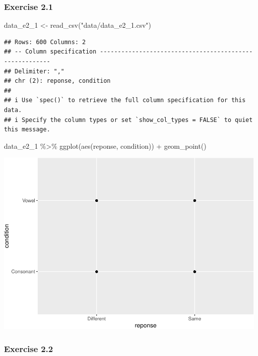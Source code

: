 \documentclass[
]{article}
\newenvironment{Shaded}{\begin{snugshade}}{\end{snugshade}}
\newcommand{\FunctionTok}[1]{\textcolor[rgb]{0.00,0.00,0.00}{#1}}
\newcommand{\NormalTok}[1]{#1}
\newcommand{\OtherTok}[1]{\textcolor[rgb]{0.56,0.35,0.01}{#1}}
\newcommand{\SpecialCharTok}[1]{\textcolor[rgb]{0.00,0.00,0.00}{#1}}
\newcommand{\StringTok}[1]{\textcolor[rgb]{0.31,0.60,0.02}{#1}}
\begin{document}
\hypertarget{exercise-2.1}{%
\subsubsection{Exercise 2.1}\label{exercise-2.1}}

\begin{Shaded}
\begin{Highlighting}[]
\NormalTok{data\_e2\_1 }\OtherTok{\textless{}{-}} \FunctionTok{read\_csv}\NormalTok{(}\StringTok{"data/data\_e2\_1.csv"}\NormalTok{)}
\end{Highlighting}
\end{Shaded}

\begin{verbatim}
## Rows: 600 Columns: 2
## -- Column specification --------------------------------------------------------
## Delimiter: ","
## chr (2): reponse, condition
## 
## i Use `spec()` to retrieve the full column specification for this data.
## i Specify the column types or set `show_col_types = FALSE` to quiet this message.
\end{verbatim}

\begin{Shaded}
\begin{Highlighting}[]
\NormalTok{data\_e2\_1 }\SpecialCharTok{\%\textgreater{}\%}
  \FunctionTok{ggplot}\NormalTok{(}\FunctionTok{aes}\NormalTok{(reponse, condition)) }\SpecialCharTok{+}
  \FunctionTok{geom\_point}\NormalTok{()}
\end{Highlighting}
\end{Shaded}

\includegraphics{analysis_files/figure-latex/e2-1-1.pdf}

\hypertarget{exercise-2.2}{%
\subsubsection{Exercise 2.2}\label{exercise-2.2}}
\end{document}
